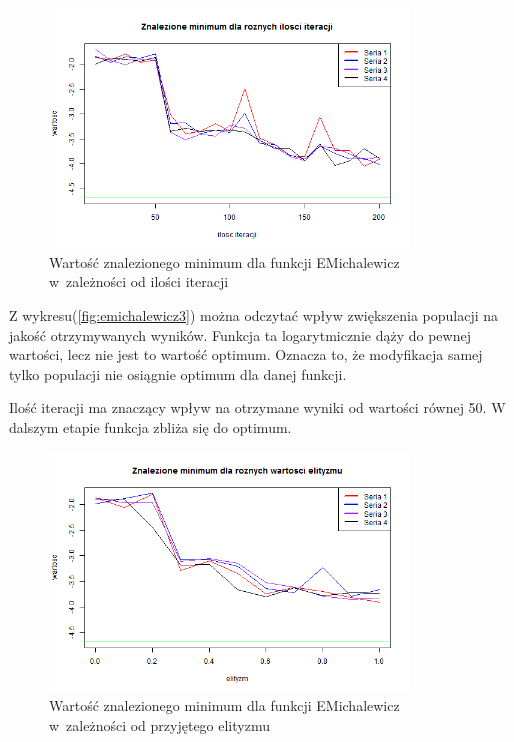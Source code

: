 \documentclass[11pt, a4paper]{article}
\newcommand{\fbi}{\leavevmode{\parindent=1em\indent}}
\begin{document}
\begin{figure}[H]
	\begin{center}
		\includegraphics[width=0.85\textwidth]{./assets/EMichalewicz5.png}
		\caption{Wartość znalezionego minimum dla funkcji EMichalewicz w~zależności od ilości iteracji}
		\label{fig:emichalewicz5}
	\end{center}
\end{figure}

\fbi
Z wykresu(\ref{fig:emichalewicz3}) można odczytać wpływ zwiększenia populacji na jakość otrzymywanych wyników. Funkcja ta logarytmicznie dąży do pewnej wartości, lecz nie jest to wartość optimum. Oznacza to, że modyfikacja samej tylko populacji nie osiągnie optimum dla danej funkcji.

\fbi
Ilość iteracji ma znaczący wpływ na otrzymane wyniki od wartości równej 50. W dalszym etapie funkcja zbliża się do optimum.

\begin{figure}[H]
	\begin{center}
		\includegraphics[width=0.85\textwidth]{./assets/EMichalewicz6.png}
		\caption{Wartość znalezionego minimum dla funkcji EMichalewicz w~zależności od przyjętego elityzmu}
		\label{fig:emichalewicz6}
	\end{center}
\end{figure}
\end{document}
